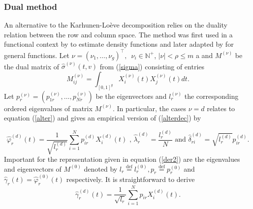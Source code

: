 \subsubsection{Dual method}\label{DM}
An alternative to the Karhunen-Lo{\`e}ve decomposition relies on the duality relation between the row and column space. The method was first used in a functional context by \cite{Kneip2001} to estimate density functions and later adapted by \cite{Benko:2009} for general functions. Let $\nu=(\nu_1,\dots,\nu_g)^{\top}, \;\ \nu_i \in \mathbb{N}^+$, $|\nu|<\rho\leq m $ a and $M^{(\nu)}$ be the dual matrix of $\hat{\sigma}^{(\nu)}(t,v)$ from (\ref{sigma}) consisting of entries  %
\begin{equation}\label{Mij0}
M^{(\nu)}_{ij}= \int_{[0,1]^g} X^{(\nu)}_i(t) X^{(\nu)}_j(t) dt.
\end{equation}
Let $p^{(\nu)}_r=(p^{(\nu)}_{1r}, \ldots, p^{(\nu)}_{Nr})$ be the eigenvectors and  $l^{(\nu)}_r$ the corresponding ordered eigenvalues of matrix $M^{(\nu)}$. 
In particular, the cases $\nu=d$ relates to equation (\ref{alter}) and gives an empirical version of (\ref{alterdec}) by

\begin{equation} \label{naiveev}
\hat{\varphi}^{(d)}_r(t) = \frac{1}{\sqrt{l_r^{(d)}} } \sum_{i=1}^N p^{(d)}_{ir} X^{(d)}_i(t) \text{ , } \hat{\lambda}^{(d)}_r=\frac{l^{(d)}_r}{N} \text{ and } \hat{ \delta }^{(d)}_{ri}= \sqrt{l^{(d)}_r} p^{(d)}_{ir}.
\end{equation}
Important for the representation given in equation (\ref{der2}) are the eigenvalues and eigenvectors of $M^{(0)}$ denoted by $l_r\stackrel{\operatorname{def}}{=} l^{(0)}_r, p_r\stackrel{\operatorname{def}}{=}p^{(0)}_r$ and $\hat{\gamma}_r(t)=\hat{\varphi}^{(0)}_r(t)$ respectively. It is straightforward to derive %
\begin{equation} \label{evd}
\hat{\gamma}^{(d)}_r(t) =\frac{1}{\sqrt{l_r} } \sum_{i=1}^N p_{ir} X^{(d)}_i(t). 
\end{equation}

